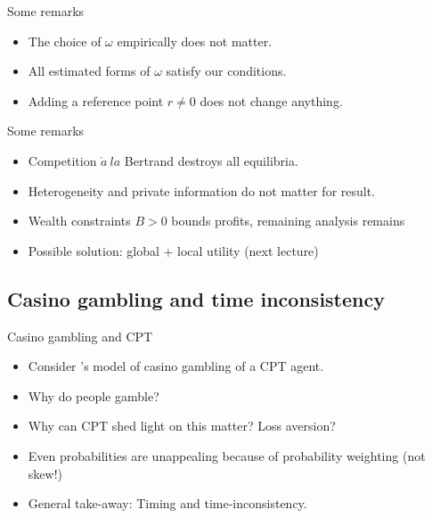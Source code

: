 \documentclass[11pt, aspectratio=169]{beamer}
\begin{document}
       \begin{frame}{Some remarks}
           \begin{itemize}
               \item The choice of $\omega$ empirically does not matter.\bigskip
               \item All estimated forms of $\omega$ satisfy our conditions.\bigskip
               \item Adding a reference point $r\neq 0$ does not change anything.\bigskip
           \end{itemize}
       \end{frame}

       \begin{frame}{Some remarks}
        \begin{itemize}
            \item Competition $\grave{a}~la$ Bertrand destroys all equilibria.\bigskip
            \item Heterogeneity and private information do not matter for result.\bigskip
            \item Wealth constraints $B>0$ bounds profits, remaining analysis remains\bigskip
            \item Possible solution: global + local utility (next lecture)\bigskip
        \end{itemize}
    \end{frame}


\subsection{Casino gambling and time inconsistency}

\begin{frame}{Casino gambling and CPT}
    \begin{itemize}
        \item Consider \citet{Barberis2012a}'s model of casino gambling of a CPT agent.\bigskip
        \item Why do people gamble?\bigskip
        \item Why can CPT shed light on this matter? Loss aversion?\bigskip
        \item Even probabilities are unappealing because of probability weighting (not skew!)\bigskip
        \item General take-away: Timing and time-inconsistency.\bigskip
    \end{itemize}
\end{frame}
\end{document}
